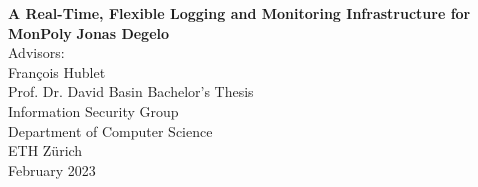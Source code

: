 \begin{titlepage}
    \begin{center}
        \vspace*{1cm}
        \Huge
        \textbf{A Real-Time, Flexible Logging and Monitoring Infrastructure for MonPoly}
        \vspace{0.5cm}
        \LARGE
        \vspace{1.5cm}
        \textbf{Jonas Degelo} \\
        \vspace{1.5cm}
        Advisors: \\
        François Hublet \\
        Prof. Dr. David Basin
        \vfill
        Bachelor's Thesis \\
        \vspace{0.8cm}
        \Large
        Information Security Group\\
        Department of Computer Science\\
        ETH Zürich\\
        February 2023
    \end{center}
\end{titlepage}